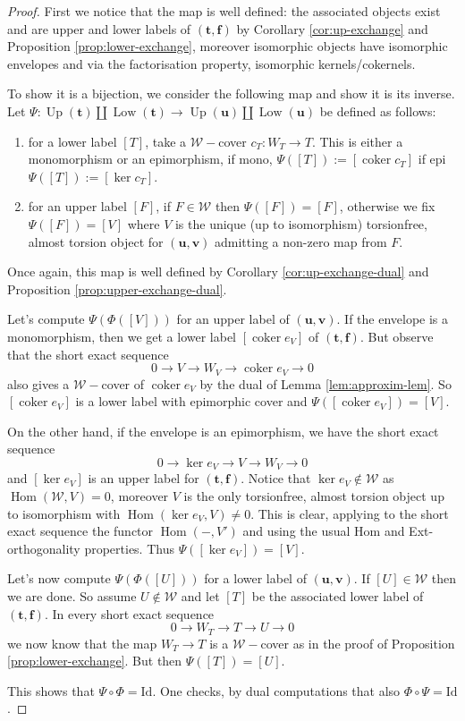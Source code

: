\documentclass[11pt]{amsart}
\theoremstyle{definition}
\newcommand{\coker}{\operatorname{coker}}
\newcommand{\W}{\mathcal W}
\newcommand{\Hom}{\operatorname{Hom}}
\newcommand{\Up}{\operatorname{Up}}
\newcommand{\Low}{\operatorname{Low}}
\newcommand{\tpair}[2]{(\mathbf{#1}, \mathbf{#2})  }
\begin{document}
\begin{proof}
First we notice that the map is well defined: the associated objects exist and are upper and lower labels of \( \tpair{t}{f} \) by Corollary \ref{cor:up-exchange} and  Proposition \ref{prop:lower-exchange}, moreover isomorphic objects have isomorphic envelopes and via the factorisation property, isomorphic kernels/cokernels.

To show it is a bijection, we consider the following map and show it is its inverse.
Let \( \Psi :  \Up(\mathbf t)\coprod \Low(\mathbf t) \to  \Up(\mathbf u)\coprod \Low(\mathbf u) \) be defined as follows:
\begin{enumerate}
\item  for a lower label $ [T] $, take  a \(\mathcal{W}-\)cover \( c_T : W_T \to T \).  This is either a monomorphism or an epimorphism, if mono, $ \Psi([T]) := [\coker c_T] $ if epi $ \Psi([T]) := [\ker c_T] $.
\item for an upper label \( [F] \), if \( F \in \mathcal{W} \) then \( \Psi([F]) = [F] \), otherwise we fix \( \Psi([F]) = [V] \) where \( V \) is the unique (up to isomorphism) torsionfree, almost torsion object for \( \tpair{u}{v} \) admitting a non-zero map from \( F \).
\end{enumerate}

Once again, this map is well defined by Corollary \ref{cor:up-exchange-dual} and  Proposition \ref{prop:upper-exchange-dual}. 

Let's compute \( \Psi(\Phi([V])) \) for an upper label of \( \tpair{u}{v} \). If the envelope is a monomorphism, then we get a lower label \(  [\coker e_V] \) of \( \tpair{t}{f} \). But observe that the short exact sequence
\[
0 \to V \to W_V \to \coker e_V \to 0
\]
also gives a \( \mathcal{W}-\)cover of \( \coker e_V \) by the dual of Lemma \ref{lem:approxim-lem}. So \( [\coker e_V] \) is a lower label with epimorphic cover and \( \Psi( [\coker e_V] ) = [ V] \).

On the other hand, if the envelope is an epimorphism, we have the short exact sequence
\[
0 \to \ker e_V \to V \to W_V \to 0
\]
and \( [ \ker e_V ] \) is an upper label for \( \tpair{t}{f} \). Notice that \( \ker e_V \not \in \W \) as \( \Hom(\mathcal{W}, V) = 0 \), moreover \( V \) is the only torsionfree, almost torsion object up to isomorphism with \( \Hom( \ker e_V, V) \ne 0 \). This is clear, applying to the short exact sequence the functor \( \Hom(-, V') \) and using the usual Hom and Ext-orthogonality properties. Thus \( \Psi([\ker e_V ]) = [V] \). 

Let's now compute  \( \Psi(\Phi([U])) \) for a lower label of \( \tpair{u}{v} \). If \( [U] \in \mathcal{W} \) then we are done. So assume \( U \not \in \mathcal{W} \) and let \( [T] \) be the associated lower label of \( \tpair{t}{f} \). In every short exact sequence
\[
0 \to W_T \to T \to U \to 0
\] 
we now know that the map \( W_T \to T \) is a \( \mathcal{W}-\)cover as in the proof of Proposition \ref{prop:lower-exchange}. But then \( \Psi([T]) = [U] \). 

This shows that \( \Psi \circ \Phi = \mathrm{Id} \). One checks, by dual computations that also \( \Phi \circ \Psi = \mathrm{Id} \).
\end{proof}
\end{document}
